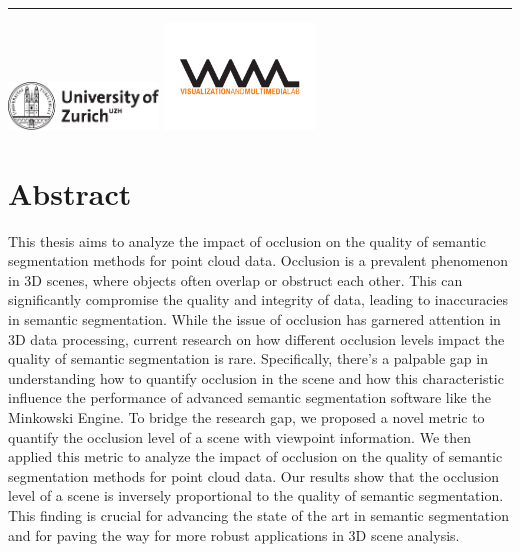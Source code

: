 \documentclass[11pt, a4paper,oneside,chapterprefix=false]{scrbook}
\begin{document}
\begin{titlepage}
	\vfill
	\hrule
	\vspace{0.5cm}
	\includegraphics*[width=0.3\textwidth]{figures/uzh_logo} \hfill
	\includegraphics*[width=0.3\textwidth]{figures/vmml_logo}
\end{titlepage}

\chapter{Abstract} \label{chp:abstract}

This thesis aims to analyze the impact of occlusion on the quality of semantic segmentation methods for point cloud data. Occlusion is a prevalent phenomenon in 3D scenes, where objects often overlap or obstruct each other. This can significantly compromise the quality and integrity of data, leading to inaccuracies in semantic segmentation. While the issue of occlusion has garnered attention in 3D data processing, current research on how different occlusion levels impact the quality of semantic segmentation is rare. Specifically, there's a palpable gap in understanding how to quantify occlusion in the scene and how this characteristic influence the performance of advanced semantic segmentation software like the Minkowski Engine. To bridge the research gap, we proposed a novel metric to quantify the occlusion level of a scene with viewpoint information. We then applied this metric to analyze the impact of occlusion on the quality of semantic segmentation methods for point cloud data. Our results show that the occlusion level of a scene is inversely proportional to the quality of semantic segmentation. This finding is crucial for advancing the state of the art in semantic segmentation and for paving the way for more robust applications in 3D scene analysis.

\tableofcontents

\mainmatter
\end{document}
